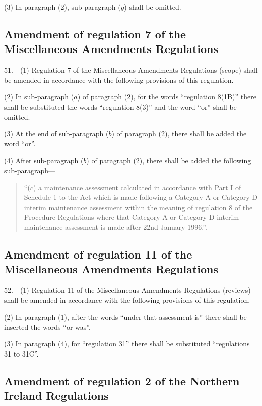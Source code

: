 \documentclass[a4paper]{article}
\begin{document}
(3) In paragraph (2), sub-paragraph ($g$) shall be omitted.

\subsection[51. Amendment of regulation 7 of the Miscellaneous Amendments Regulations]{Amendment of regulation 7 of the Miscellaneous Amendments Regulations}

51.—(1) Regulation 7 of the Miscellaneous Amendments Regulations (scope) shall be amended in accordance with the following provisions of this regulation.

(2) In sub-paragraph ($a$) of paragraph (2), for the words “regulation 8(1B)” there shall be substituted the words “regulation 8(3)” and the word “or” shall be omitted.

(3) At the end of sub-paragraph ($b$) of paragraph (2), there shall be added the word “or”.

(4) After sub-paragraph ($b$) of paragraph (2), there shall be added the following sub-paragraph—
\begin{quotation}
“($c$) a maintenance assessment calculated in accordance with Part I of Schedule 1 to the Act which is made following a Category A or Category D interim maintenance assessment within the meaning of regulation 8 of the Procedure Regulations where that Category A or Category D interim maintenance assessment is made after 22nd January 1996.”.
\end{quotation}

\subsection[52. Amendment of regulation 11 of the Miscellaneous Amendments Regulations]{\sloppy Amendment of regulation 11 of the Miscellaneous Amendments Regulations}

52.—(1) Regulation 11 of the Miscellaneous Amendments Regulations (reviews) shall be amended in accordance with the following provisions of this regulation.

(2) In paragraph (1), after the words “under that assessment is” there shall be inserted the words “or was”.

(3) In paragraph (4), for “regulation 31” there shall be substituted “regulations 31 to 31C”.

\subsection[53. Amendment of regulation 2 of the Northern Ireland Regulations]{\sloppy Amendment of regulation 2 of the Northern Ireland Regulations}
\end{document}
